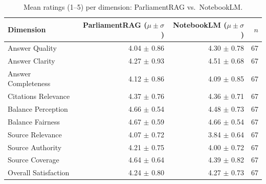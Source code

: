 \begin{table}[htbp]
\centering
\caption{Mean ratings (1--5) per dimension: ParliamentRAG vs.\ NotebookLM.}
\label{tab:human_ratings}
\small
\begin{tabular}{lrrr}
\toprule
Dimension & ParliamentRAG ($\mu \pm \sigma$) & NotebookLM ($\mu \pm \sigma$) & $n$ \\
\midrule
Answer Quality & 4.04 $\pm$ 0.86 & 4.30 $\pm$ 0.78 & 67 \\
Answer Clarity & 4.27 $\pm$ 0.93 & 4.51 $\pm$ 0.68 & 67 \\
Answer Completeness & 4.12 $\pm$ 0.86 & 4.09 $\pm$ 0.85 & 67 \\
Citations Relevance & 4.37 $\pm$ 0.76 & 4.36 $\pm$ 0.71 & 67 \\
Balance Perception & 4.66 $\pm$ 0.54 & 4.48 $\pm$ 0.73 & 67 \\
Balance Fairness & 4.67 $\pm$ 0.59 & 4.66 $\pm$ 0.54 & 67 \\
Source Relevance & 4.07 $\pm$ 0.72 & 3.84 $\pm$ 0.64 & 67 \\
Source Authority & 4.21 $\pm$ 0.75 & 4.00 $\pm$ 0.72 & 67 \\
Source Coverage & 4.64 $\pm$ 0.64 & 4.39 $\pm$ 0.82 & 67 \\
Overall Satisfaction & 4.24 $\pm$ 0.80 & 4.27 $\pm$ 0.73 & 67 \\
\bottomrule
\end{tabular}
\end{table}